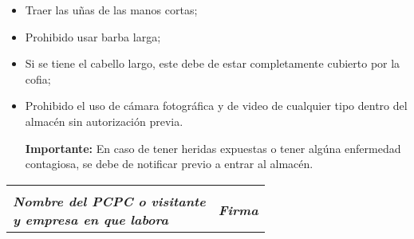 \begin{center}
\begin{minipage}{0.9\linewidth}
\begin{itemize}
                \item Traer las uñas de las manos cortas;
                \item Prohibido usar barba larga;
                \item Si se tiene el cabello largo, este debe de estar completamente cubierto por la cofia;
                \item Prohibido el uso de cámara fotográfica y de video de cualquier tipo dentro del almacén sin autorización previa.
                \item[\textbf{Importante:}] En caso de tener heridas expuestas o tener algúna enfermedad contagiosa, se debe de notificar previo a entrar al almacén.
            \end{itemize}
        \end{minipage}
\end{center}

\vfill
\begin{center}
\noindent\begin{tabular}{@{}>{\centering}p{2.5in}>{\centering}p{2.5in}@{}}
    \small
    \hrulefill                         & \hrulefill \tabularnewline
    \textbf{\textit{Nombre del PCPC o visitante\\y empresa en que labora}}      & \textbf{\textit{Firma}}\\  
    \end{tabular}
\end{center}
\vfill
